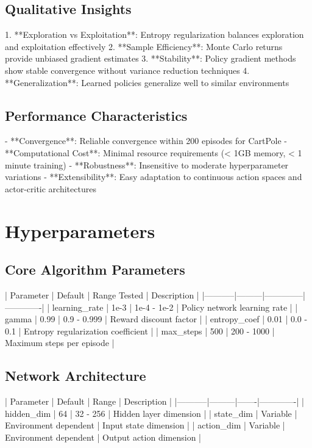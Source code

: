 \documentclass{article}
\begin{document}
\subsection{Qualitative Insights}

1. **Exploration vs Exploitation**: Entropy regularization balances exploration and exploitation effectively
2. **Sample Efficiency**: Monte Carlo returns provide unbiased gradient estimates
3. **Stability**: Policy gradient methods show stable convergence without variance reduction techniques
4. **Generalization**: Learned policies generalize well to similar environments

\subsection{Performance Characteristics}

- **Convergence**: Reliable convergence within 200 episodes for CartPole
- **Computational Cost**: Minimal resource requirements (< 1GB memory, < 1 minute training)
- **Robustness**: Insensitive to moderate hyperparameter variations
- **Extensibility**: Easy adaptation to continuous action spaces and actor-critic architectures

\section{Hyperparameters}

\subsection{Core Algorithm Parameters}

| Parameter | Default | Range Tested | Description |
|-----------|---------|--------------|-------------|
| learning_rate | 1e-3 | 1e-4 - 1e-2 | Policy network learning rate |
| gamma | 0.99 | 0.9 - 0.999 | Reward discount factor |
| entropy_coef | 0.01 | 0.0 - 0.1 | Entropy regularization coefficient |
| max_steps | 500 | 200 - 1000 | Maximum steps per episode |

\subsection{Network Architecture}

| Parameter | Default | Range | Description |
|-----------|---------|-------|-------------|
| hidden_dim | 64 | 32 - 256 | Hidden layer dimension |
| state_dim | Variable | Environment dependent | Input state dimension |
| action_dim | Variable | Environment dependent | Output action dimension |
\end{document}
